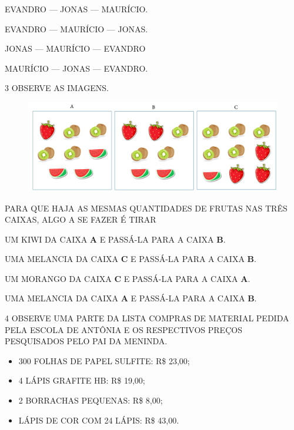 \begin{escolha}[itemsep=0pt]
\item EVANDRO --- JONAS --- MAURÍCIO.

\item EVANDRO --- MAURÍCIO --- JONAS.

\item JONAS --- MAURÍCIO --- EVANDRO

\item MAURÍCIO --- JONAS --- EVANDRO.
\end{escolha}

\pagebreak
\num{3} OBSERVE AS IMAGENS.

\begin{figure}[htpb!]
\centering
\includegraphics[width=\textwidth]{./media/SAEB_1ANO_MAT_FIGURA137.png}
\end{figure}

PARA QUE HAJA AS MESMAS QUANTIDADES DE FRUTAS NAS TRÊS CAIXAS, ALGO
A SE FAZER É TIRAR

\begin{escolha}[itemsep=0pt]
\item UM KIWI DA CAIXA \textbf{A} E PASSÁ-LA PARA A CAIXA \textbf{B}.

\item UMA MELANCIA DA CAIXA \textbf{C} E PASSÁ-LA PARA A CAIXA \textbf{B}.

\item UM MORANGO DA CAIXA \textbf{C} E PASSÁ-LA PARA A CAIXA \textbf{A}.

\item UMA MELANCIA DA CAIXA \textbf{A} E PASSÁ-LA PARA A CAIXA \textbf{B}.
\end{escolha}

\num{4} OBSERVE UMA PARTE DA LISTA COMPRAS DE MATERIAL PEDIDA PELA ESCOLA DE ANTÔNIA E OS RESPECTIVOS PREÇOS PESQUISADOS PELO PAI DA MENINDA.

\begin{myquote}
\begin{itemize}
  \item 300 FOLHAS DE PAPEL SULFITE: R\$ 23,00;
  \item 4 LÁPIS GRAFITE HB: R\$ 19,00;
  \item 2 BORRACHAS PEQUENAS: R\$ 8,00;
  \item LÁPIS DE COR COM 24 LÁPIS: R\$ 43,00.
\end{itemize}
\end{myquote}

